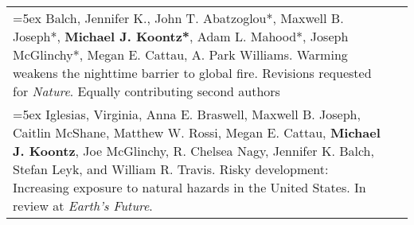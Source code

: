 \begin{longtable}{@{} >{\raggedright}p{6.25in} >{\raggedleft}X @{}}
\hangindent=5ex Balch, Jennifer K., John T. Abatzoglou*, Maxwell B. Joseph*, \textbf{Michael J. Koontz*}, Adam L. Mahood*, Joseph McGlinchy*, Megan E. Cattau, A. Park Williams. Warming weakens the nighttime barrier to global fire. Revisions requested for \emph{Nature}. 
\newline *Equally contributing second authors & \tabularnewline

\hangindent=5ex Iglesias, Virginia, Anna E. Braswell, Maxwell B. Joseph, Caitlin McShane, Matthew W. Rossi, Megan E. Cattau, \textbf{Michael J. Koontz}, Joe McGlinchy, R. Chelsea Nagy, Jennifer K. Balch, Stefan Leyk, and William R. Travis. Risky development: Increasing exposure to natural hazards in the United States. In review at \emph{Earth's Future}. & \tabularnewline


\end{longtable}
